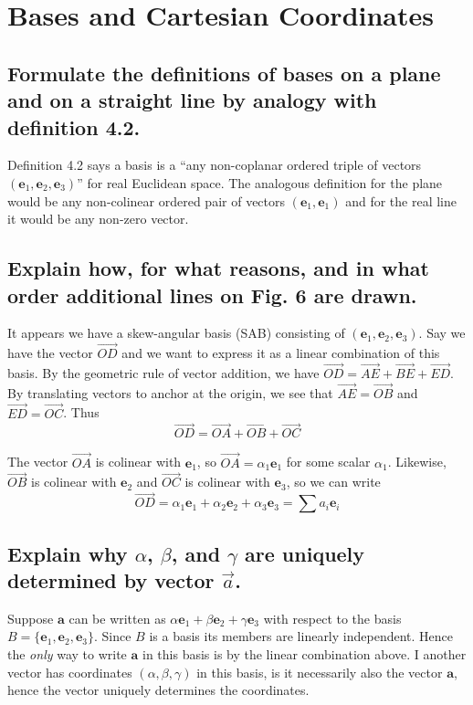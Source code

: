 \documentclass{article}
\begin{document}
\section{Bases and Cartesian Coordinates}
\subsection{Formulate the definitions of bases on a plane and on a straight line by analogy with definition 4.2.}

Definition 4.2 says a basis is a ``any non-coplanar ordered triple of vectors $(\mathbf{e}_1, \mathbf{e}_2, \mathbf{e}_3)$'' for real Euclidean space. The analogous definition for the plane would be any non-colinear ordered pair of vectors $(\mathbf{e}_1, \mathbf{e}_1)$ and for the real line it would be any non-zero vector.

\subsection{Explain how, for what reasons, and in what order additional lines on Fig. 6 are drawn.}

It appears we have a skew-angular basis (SAB) consisting of $(\mathbf{e}_1, \mathbf{e}_2, \mathbf{e}_3)$. Say we have the vector $\vec{OD}$ and we want to express it as a linear combination of this basis. By the geometric rule of vector addition, we have $\vec{OD} = \vec{AE} + \vec{BE} + \vec{ED}$. By translating vectors to anchor at the origin, we see that $\vec{AE} = \vec{OB}$ and $\vec{ED} = \vec{OC}$. Thus
$$\overrightarrow{OD} = \overrightarrow{OA} + \overrightarrow{OB} + \overrightarrow{OC}$$

The vector $\overrightarrow{OA}$ is colinear with $\mathbf{e}_1$, so $\overrightarrow{OA} = \alpha_1\mathbf{e}_1$ for some scalar $\alpha_1$. Likewise, $\overrightarrow{OB}$ is colinear with $\mathbf{e}_2$ and $\overrightarrow{OC}$ is colinear with $\mathbf{e}_3$, so we can write
$$\overrightarrow{OD} = \alpha_1 \mathbf{e}_1 +  \alpha_2 \mathbf{e}_2 +  \alpha_3 \mathbf{e}_3 = \sum a_i \mathbf{e}_i$$

\subsection{Explain why $\alpha$, $\beta$, and $\gamma$ are uniquely determined by vector $\vec{a}$.}

Suppose $\mathbf{a}$ can be written as $\alpha \mathbf{e}_1 + \beta \mathbf{e}_2 + \gamma \mathbf{e}_3$ with respect to the basis $B = \{\mathbf{e}_1, \mathbf{e}_2, \mathbf{e}_3\}$. Since $B$ is a basis its members are linearly independent. Hence the \emph{only} way to write $\mathbf{a}$ in this basis is by the linear combination above. I another vector has coordinates $(\alpha, \beta, \gamma)$ in this basis, is it necessarily also the vector $\mathbf{a}$, hence the vector uniquely determines the coordinates.
\end{document}
